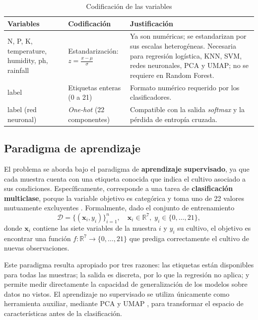 \documentclass[conference]{IEEEtran}
\begin{document}
\begin{table}[htbp]
\caption{Codificación de las variables}
\label{tab:codificacion}
\centering
\footnotesize
\setlength{\tabcolsep}{4pt}
\begin{tabular}{>{\raggedright\arraybackslash}p{1.7cm}>{\raggedright\arraybackslash}p{2.2cm}>{\raggedright\arraybackslash}p{3.5cm}}
\toprule
\textbf{Variables} & \textbf{Codificación} & \textbf{Justificación} \\
\midrule
N, P, K, temperature, humidity, ph, rainfall & Estandarización: $z=\frac{x-\mu}{\sigma}$ & Ya son numéricas; se estandarizan por sus escalas heterogéneas. Necesaria para regresión logística, KNN, SVM, redes neuronales, PCA y UMAP; no se requiere en Random Forest. \\
\midrule
label & Etiquetas enteras (0 a 21) & Formato numérico requerido por los clasificadores. \\
\midrule
label (red neuronal) & \emph{One-hot} (22 componentes) & Compatible con la salida \emph{softmax} y la pérdida de entropía cruzada. \\
\bottomrule
\end{tabular}
\end{table}

\subsection{Paradigma de aprendizaje}

El problema se aborda bajo el paradigma de \textbf{aprendizaje supervisado}, ya que cada muestra cuenta con una etiqueta conocida que indica el cultivo asociado a sus condiciones. Específicamente, corresponde a una tarea de \textbf{clasificación multiclase}, porque la variable objetivo es categórica y toma uno de 22 valores mutuamente excluyentes \cite{bishop2006,hastie2009}. Formalmente, dado el conjunto de entrenamiento
\begin{equation}
\mathcal{D}=\{(\mathbf{x}_i,y_i)\}_{i=1}^{n},\quad \mathbf{x}_i\in\mathbb{R}^{7},\; y_i\in\{0,\dots,21\},
\end{equation}
donde $\mathbf{x}_i$ contiene las siete variables de la muestra $i$ y $y_i$ su cultivo, el objetivo es encontrar una función $f:\mathbb{R}^{7}\rightarrow\{0,\dots,21\}$ que prediga correctamente el cultivo de nuevas observaciones.

Este paradigma resulta apropiado por tres razones: las etiquetas están disponibles para todas las muestras; la salida es discreta, por lo que la regresión no aplica; y permite medir directamente la capacidad de generalización de los modelos sobre datos no vistos. El aprendizaje no supervisado se utiliza únicamente como herramienta auxiliar, mediante PCA \cite{hastie2009} y UMAP \cite{mcinnes2018}, para transformar el espacio de características antes de la clasificación.
\end{document}
